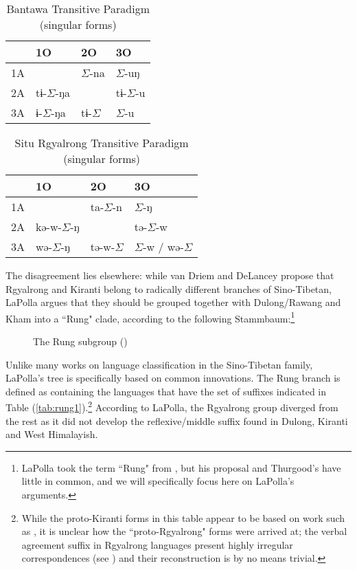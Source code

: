 \documentclass[oldfontcommands,oneside,a4paper,11pt]{article}
\newcommand{\grise}[1]{\cellcolor{lightgray}\textbf{#1}}
\newcommand{\ra}{$\Sigma$}
\begin{document}
 \begin{table}[H]
 \caption{Bantawa Transitive Paradigm (singular forms)} \centering \label{tab:bantawa}
 \begin{tabular}{l|l|l|l|}
  &1O&2O&3O\\
 \hline
1A & 	\grise{} & 	\ra{}-na & 	\ra{}-uŋ \\ 
2A & 	tɨ-\ra{}-ŋa & 	\grise{}	 & 	tɨ-\ra{}-u \\ 
3A & 	ɨ-\ra{}-ŋa & 	tɨ-\ra{} & 	\ra{}-u \\ 
 \hline
\end{tabular}
\end{table}

 \begin{table}[H]
 \caption{Situ Rgyalrong Transitive Paradigm (singular forms)} \centering \label{tab:situ}
 \begin{tabular}{l|l|l|l|}
  &1O&2O&3O\\
 \hline
1A & 	\grise{} & 	ta-\ra{}-n & 	\ra{}-ŋ \\ 
2A & 	kə-w-\ra{}-ŋ & 	\grise{}	 & 	tə-\ra{}-w \\ 
3A & 	wə-\ra{}-ŋ & 	tə-w-\ra{} & 	\ra{}-w / wə-\ra{}\\ 
 \hline
\end{tabular}
\end{table}


The  disagreement lies elsewhere: while van Driem and DeLancey propose that Rgyalrong and Kiranti belong to radically different branches of Sino-Tibetan, LaPolla argues that they should be grouped together with Dulong/Rawang and Kham into a ``Rung" clade, according to the following Stammbaum:\footnote{LaPolla took the term ``Rung" from \citet{thurgood85pro} , but his proposal and Thurgood's have little in common, and we will specifically focus here on LaPolla's arguments. }
\begin{figure}[H]
\caption{The Rung subgroup (\citealt[394]{lapolla05st})} \label{fig:rung}
\begin{newicktree}
  \small
  \setunitlength{20cm} \righttree \nobranchlengths \nodelabelformat{}
  \par %
\end{newicktree}
\end{figure}

Unlike many works on language classification in the Sino-Tibetan family, LaPolla's tree is specifically based on   common innovations. The Rung branch is defined as containing the languages that have the set of suffixes indicated in Table (\ref{tab:rung1}).\footnote{While the proto-Kiranti forms in this table appear to be based on  work such as \citet{driem93agreement}, it is unclear how the ``proto-Rgyalrong" forms  were arrived at; the verbal agreement suffix in Rgyalrong languages present highly irregular correspondences (see \citealt{gongxun12}) and their reconstruction is by no means trivial. } According to LaPolla, the Rgyalrong group diverged from the rest as it did not develop the reflexive/middle suffix found in Dulong, Kiranti and West Himalayish.
\end{document}
